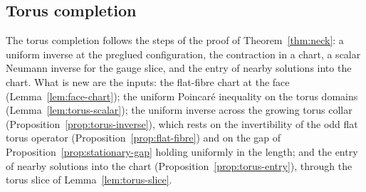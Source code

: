\documentclass[11pt]{amsart}
\theoremstyle{definition}
\theoremstyle{remark}
\theoremstyle{plain}
\numberwithin{equation}{section}
\begin{document}
\subsection{Torus completion}\label{subsec:torus-completion}

The torus completion follows the steps of the proof of Theorem~\ref{thm:neck}: a uniform
inverse at the preglued configuration, the contraction in a chart, a scalar Neumann inverse for
the gauge slice, and the entry of nearby solutions into the chart. What is new are the inputs: the flat-fibre chart at the face
(Lemma~\ref{lem:face-chart}); the uniform Poincar\'e inequality on the torus domains
(Lemma~\ref{lem:torus-scalar}); the uniform inverse across the growing torus collar
(Proposition~\ref{prop:torus-inverse}), which rests on the invertibility of the odd flat torus
operator (Proposition~\ref{prop:flat-fibre}) and on the gap of
Proposition~\ref{prop:stationary-gap} holding uniformly in the length; and the entry of nearby
solutions into the chart (Proposition~\ref{prop:torus-entry}), through the torus slice of
Lemma~\ref{lem:torus-slice}.
\end{document}
